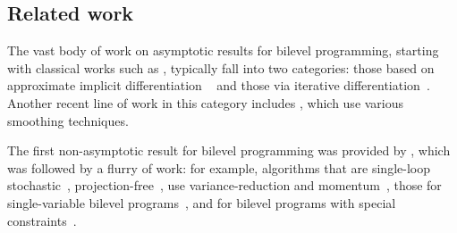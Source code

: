 \subsection{Related work}\label{sec:related_work} 
The vast body of work on asymptotic results for bilevel programming, starting with classical works such as \cite{anandalingam1990solution, ishizuka1992double, white1993penalty, vicente1994descent, ye1995optimality, ye1997exact}, typically fall into two categories: those based on approximate implicit differentiation ~\cite{domke2012generic, pedregosa2016hyperparameter, gould2016differentiating, amos2017optnet, liao2018reviving, agrawal2019differentiable, grazzi2020iteration, lorraine2020optimizing} and those via iterative differentiation~\cite{domke2012generic, maclaurin2015gradient, franceschi2017forward,   franceschi2018bilevel,  shaban2019truncated, grazzi2020iteration}. Another recent line of work  in this category includes \cite{liu2021value, ye2023difference, khanduri2023linearly, gao2024moreau}, which use various smoothing techniques. 

The first non-asymptotic result for bilevel programming was provided by \cite{ghadimi2018approximation}, which was followed by a flurry of work: for example, algorithms that are single-loop stochastic~\cite{chen2021closing, chen2022single, hong2023two}, projection-free~\cite{akhtar2022projection, jiang2023conditional, abolfazli2023inexact, cao2024projection}, use variance-reduction and momentum~\cite{khanduri2021near, guo2021randomized, yang2021provably, dagreou2022framework}, those for single-variable bilevel programs~\cite{sabach2017first, amini2019iterative, amini2019iterativereg, jiang2023conditional, merchav2023convex}, and  for bilevel programs with special  constraints~\cite{tsaknakis2022implicit, khanduri2023linearly, xu2023efficient, abolfazli2023inexact}. 
 

